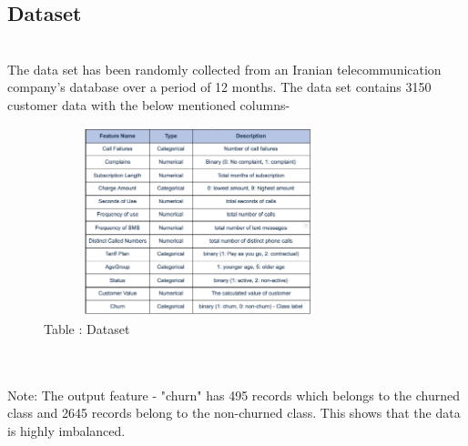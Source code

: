 \documentclass[a4paper, 10pt, conference]{ieeeconf}      %
\begin{document}
\subsection{\textbf{Dataset}}
\\The data set has been randomly collected from an Iranian telecommunication company’s database over a period of 12 months. The data set contains 3150 customer data with the below mentioned columns-
\\
\begin{figure}[htp]
    \centering
    \includegraphics[width=9cm,height=5.5cm]{Images/dataset.png}
    \caption{Table : Dataset}
    \label{fig:datasetUsed}
\end{figure}
\\\
\\Note: The output feature - "churn" has  495 records which belongs to the churned class and 2645 records belong to the non-churned class. This shows that the data is highly imbalanced.
\\\
\end{document}
